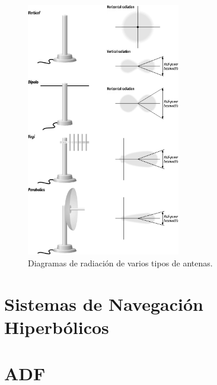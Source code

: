 \begin{figure}[!h]
  \centering
  \includegraphics[width=0.6\textwidth]{06.radionavegacion/Imagenes/06.00.ondas.electromagneticas/diagramas-radiacion-antenas.gif}
  \caption{Diagramas de radiaci\'on de varios tipos de antenas.}
  \label{fig:diagramas-radiacion-antenas}
\end{figure}





\section{Sistemas de Navegaci\'on Hiperb\'olicos}
\label{06.sistemas.navegacion.hiperbolicos}





\section{ADF}
\label{sec:U06.01.ADF}


